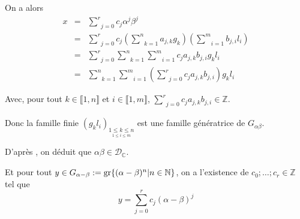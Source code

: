 On a alors
\begin{eqnarray*}
  x & = & \underset{j = 0}{\overset{r}{\sum}} c_j \alpha^j \beta^j\\
  & = & \underset{j = 0}{\overset{r}{\sum}} c_j \left( \underset{k =
  1}{\overset{n}{\sum}} a_{j, k} g_k \right) \left( \underset{i =
  1}{\overset{m}{\sum}} b_{j, i} l_i \right)\\
  & = & \underset{j = 0}{\overset{r}{\sum}} \underset{k =
  1}{\overset{n}{\sum}} \underset{i = 1}{\overset{m}{\sum}} c_j a_{j, k} b_{j,
  i} g_k l_i\\
  & = & \underset{k = 1}{\overset{n}{\sum}} \underset{i =
  1}{\overset{m}{\sum}} \left( \underset{j = 0}{\overset{r}{\sum}} c_j a_{j,
  k} b_{j, i} \right) g_k l_i
\end{eqnarray*}


Avec, pour tout $k \in \llbracket 1, n \rrbracket$ et $i \in \llbracket 1, m
\rrbracket$, $\underset{}{\overset{}{\underset{j = 0}{\overset{r}{\sum}} c_j
a_{j, k} b_{j, i} \in \mathbb{Z}}}$.

Donc la famille finie $(g_k l_i)_{\underset{1 \leqslant i \leqslant m}{1
\leqslant k \leqslant n}}$ est une famille g{\'e}n{\'e}ratrice de $G_{\alpha
\beta}$.

D'apr{\`e}s , on
d{\'e}duit que $\alpha \beta \in \mathcal{D}_{\mathbb{C}}$.

Et pour tout $y \in G_{\alpha - \beta} : = \operatorname{gr} \{ (\alpha - \beta)^n |
 n \in \mathbb{N} \}$, on a l'existence de $c_0 ; \ldots ; c_r \in
\mathbb{Z}$ tel que
\[ y = \underset{j = 0}{\overset{r}{\sum}} c_j (\alpha - \beta)^j \]


